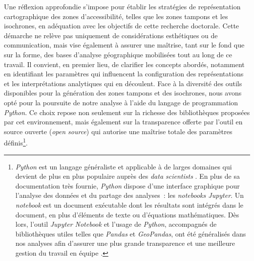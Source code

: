 \begin{refsegment}
Une réflexion approfondie s’impose pour établir les stratégies de représentation cartographique des zones d’accessibilité, telles que les zones tampons et les isochrones, en adéquation avec les objectifs de cette recherche doctorale. Cette démarche ne relève pas uniquement de considérations esthétiques ou de communication, mais vise également à assurer une maîtrise, tant sur le fond que sur la forme, des bases d’analyse géographique mobilisées tout au long de ce travail. Il convient, en premier lieu, de clarifier les concepts abordés, notamment en identifiant les paramètres qui influencent la configuration des représentations et les interprétations analytiques qui en découlent. Face à la diversité des outils disponibles pour la génération des zones tampons et des isochrones, nous avons opté pour la poursuite de notre analyse à l’aide du langage de programmation \textsl{Python}. Ce choix repose non seulement sur la richesse des bibliothèques proposées par cet environnement, mais également sur la transparence offerte par l’outil en source ouverte (\textsl{open source}) qui autorise une maîtrise totale des paramètres définis\footnote{
    \textsl{Python} est un langage généraliste et applicable à de larges domaines qui devient de plus en plus populaire auprès des \textsl{data scientists} \textcolor{blue}{\autocite[19]{velt_python_2020}}. En plus de sa documentation très fournie, \textsl{Python} dispose d'une interface graphique pour l'analyse des données et du partage des analyses~: les \textsl{notebooks Jupyter}. Un \textsl{notebook} est un document exécutable dont les résultats sont intégrés dans le document, en plus d'éléments de texte ou d'équations mathématiques. Dès lors, l'outil \textsl{Jupyter Notebook} et l'usage de \textsl{Python}, accompagnés de bibliothèques utiles telles que \textsl{Pandas} et \textsl{GeoPandas}, ont été généralisés dans nos analyses afin d'assurer une plus grande transparence et une meilleure gestion du travail en équipe \textcolor{blue}{\autocite[55, 137]{velt_python_2020}}.
}.%


\end{refsegment}
